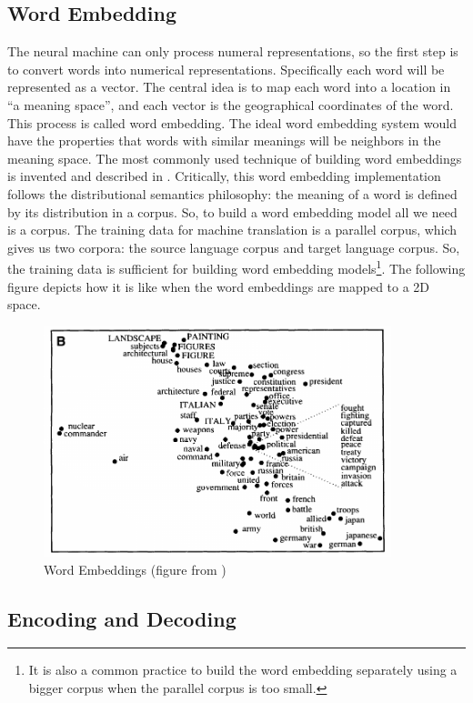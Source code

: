 \documentclass[final]{ua-thesis}
\numberwithin{equation}{section}
\begin{document}
\subsection{Word Embedding}
The neural machine can only process numeral representations, so the first step is to convert words into numerical representations. Specifically each word will be represented as a vector. The central idea is to map each word into a location in ``a meaning space'', and each vector is the geographical coordinates of the word. 
This process is called word embedding. The ideal word embedding system would have the properties that words with similar meanings will be neighbors in the meaning space. 
The most commonly used technique of building word embeddings is invented and described in \citet{mikolov2013efficient, mikolov2013distributed}. Critically, this word embedding implementation follows the distributional semantics philosophy: the meaning of a word is defined by its distribution in a corpus. So, to build a word embedding model all we need is a corpus. The training data for machine translation is a parallel corpus, which gives us two corpora: the source language corpus and target language corpus. So, the training data is sufficient for building word embedding models\footnote{It is also a common practice to build the word embedding separately using a bigger corpus when the parallel corpus is too small.}. The following figure depicts how it is like when the word embeddings are mapped to a 2D space.   

\begin{figure}
\caption{Word Embeddings (figure from \citet{roweis2000nonlinear})}
\centering
\includegraphics[width=0.9\textwidth]{word_emb.png}
\end{figure} 


\subsection{Encoding and Decoding}
\end{document}
